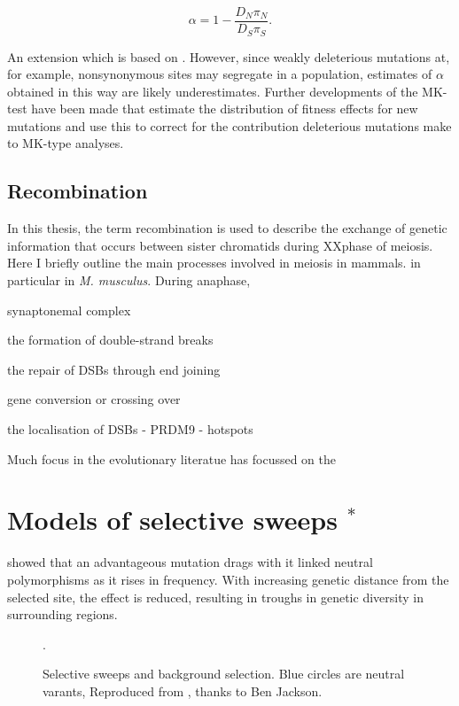 \begin{equation}
\alpha = 1 - \frac{D_N \pi_N}{D_S \pi_S}.
\end{equation}

An extension which is based on \cite{RN294}. However, since weakly deleterious mutations at, for example, nonsynonymous sites may segregate in a population, estimates of $\alpha$ obtained in this way are likely underestimates. Further developments of the MK-test have been made that estimate the distribution of fitness effects for new mutations and use this to correct for the contribution deleterious mutations make to MK-type analyses. 

\subsection{Recombination}

	In this thesis, the term recombination is used to describe the exchange of genetic information that occurs between sister chromatids during XXphase of meiosis. Here I briefly outline the main processes involved in meiosis in mammals. in particular in \textit{M. musculus}. During anaphase, 
	
	synaptonemal complex

	the formation of double-strand breaks

	the repair of DSBs through end joining 

	gene conversion or crossing over

	the localisation of DSBs - PRDM9 - hotspots

	Much focus in the evolutionary literatue has focussed on the 
		
	

\section[Models of selective sweeps]{Models of selective sweeps $^*$}

\cite{RN124} showed that an advantageous mutation drags with it linked neutral polymorphisms as it rises in frequency. With increasing genetic distance from the selected site, the effect is reduced, resulting in troughs in genetic diversity in surrounding regions.
 
 \begin{figure}[h!]
   \centering      
   \noindent{}
 \caption[Selective sweeps and background selection]{Selective sweeps and background selection. Blue circles are neutral varants, Reproduced from \cite{RN352}, thanks to Ben Jackson.}.
 
 \label{fig:sweepCartoon}
\end{figure}


